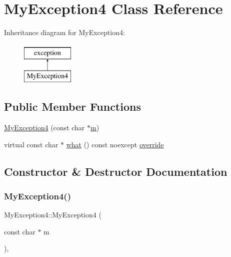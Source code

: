 \hypertarget{class_my_exception4}{}\section{My\+Exception4 Class Reference}
\label{class_my_exception4}
Inheritance diagram for My\+Exception4\+:\begin{figure}[H]
\begin{center}
\leavevmode
\includegraphics[height=2.000000cm]{class_my_exception4}
\end{center}
\end{figure}
\subsection*{Public Member Functions}
\begin{DoxyCompactItemize}
\item 
\mbox{\hyperlink{class_my_exception4_a7c1361aa20152bdba906a5d029ee1f19}{My\+Exception4}} (const char $\ast$\mbox{\hyperlink{_s_d_l__opengl__glext_8h_af593500c283bf1a787a6f947f503a5c2}{m}})
\item 
virtual const char $\ast$ \mbox{\hyperlink{class_my_exception4_a60a67269d2544ba3d2be99889eff6538}{what}} () const noexcept \mbox{\hyperlink{dictobject_8h_a055cf4fd16bde9bce026127362cee1a3}{override}}
\end{DoxyCompactItemize}


\subsection{Constructor \& Destructor Documentation}
\mbox{\label{class_my_exception4_a7c1361aa20152bdba906a5d029ee1f19}} 
\subsubsection{\texorpdfstring{MyException4()}{MyException4()}}
{\footnotesize\ttfamily My\+Exception4\+::\+My\+Exception4 (\begin{DoxyParamCaption}\item[{const char $\ast$}]{m }\end{DoxyParamCaption})\hspace{0.3cm}{\ttfamily [inline]}, {\ttfamily [explicit]}}



